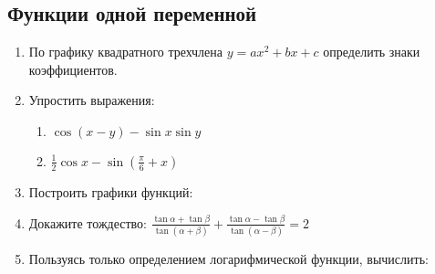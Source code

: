 \subsection*{Функции одной переменной}
\begin{enumerate}
    \item По графику квадратного трехчлена $y = ax^2 + bx + c$ определить знаки коэффициентов.
    \item Упростить выражения:
    \begin{enumerate}
        \item $\cos (x - y) - \sin x \sin y$
        \item $\frac{1}{2} \cos x - \sin(\frac{\pi}{6} + x)$
    \end{enumerate}
    \item Построить графики функций:
    \item Докажите тождество: $\frac{\tan \alpha + \tan \beta}{\tan(\alpha + \beta)} + \frac{\tan \alpha - \tan \beta}{\tan(\alpha - \beta)} = 2$
    \item Пользуясь только определением логарифмической функции, вычислить: 
\end{enumerate}
